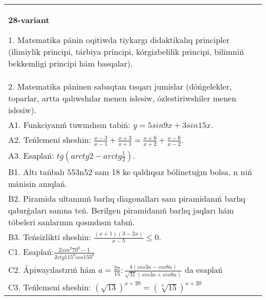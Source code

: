 \documentclass{article}
\begin{document}
\begin{tabular}{m{17cm}}
\textbf{28-variant}

1. Matematika pánin oqitiwda tiykargı didaktikalıq principler (ilimiylik principi, tárbiya principi, kórgizbelilik principi, bilimniń bekkemligi principi hám basqalar). \\
2. Matematika páninen sabaqtan tısqarı jumislar (dóńgelekler, toparlar, artta qalıwshılar menen islesiw, ózlestiriwshiler menen islesiw). \\
A1. Funkciyanıń tuwındısın tabiń: \(y = 5 sin 9x + 3 sin 15x\). \\
A2. Teńlemeni sheshin: \(\frac{x - 3}{x - 1} + \frac{x + 3}{x + 1} = \frac{x + 6}{x + 2} + \frac{x - 6}{x - 2}\). \\
A3. Esaplań: \(tg\left(arctg2 - arctg\frac{1}{2} \right) \). \\
B1. Altı tańbalı 553n52 sanı 18 ke qaldıqsız bólinetuģın bolsa, n niń mánisin anıqlań. \\
B2. Piramida ultanınıń barlıq diagonalları sanı piramidanıń barlıq qabırǵaları sanına teń. Berilgen piramidanıń barlıq jaqları hám tóbeleri sanlarının qosındısın tabıń. \\
B3. Teńsizlikti sheshin: \(\frac{ (x + 1) (3 - 2x) }{x - 5} \leq 0\). \\
C1. Esaplań:\(\frac{2sin^{2}70^{0} - 1}{2ctg115^{0}cos155^{0}}\) \\
C2. Ápiwayılastırıń hám \(a = \frac{2\pi}{15}:\frac{4 (cos3a - cos8a) }{\sqrt{31} (sin3a + sin8a) }\) da esaplań \\
C3. Teńlemeni sheshin: \((\sqrt{13}) ^{x + 20} = (\sqrt[3]{15}) ^{x + 20}\) \\

\end{tabular}
\vspace{1cm}
\end{document}
